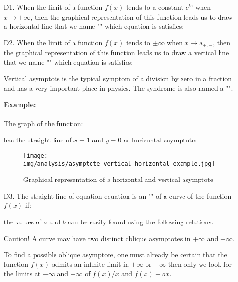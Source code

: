 	\begin{enumerate}
		\item[D1.] When the limit of a function $f(x)$ tends to a constant 
$c^{te}$ when $x \rightarrow \pm \infty$, then the graphical representation of this function leads us to draw a horizontal line that we name "" which equation is satisfies:
		
		
		\item[D2.] When the limit of a function $f(x)$ tends to  
$\pm \infty$ when $x \rightarrow a_{+,-}$, then the graphical representation of this function leads us to draw a vertical line that we name "" which equation is satisfies:
		
		Vertical asymptots is the typical symptom of a division by zero in a fraction and has a very important place in physics. The syndrome is also named a "".
		\begin{tcolorbox}[colframe=black,colback=white,sharp corners]
		\textbf{{\Large {}}Example:}\\\\
		The graph of the function:
		
		 has the straight line of $x=1$ and $y=0$ as horizontal asymptote:
		 \begin{figure}[H]
			\centering
			\texttt{[image: img/analysis/asymptote\_vertical\_horizontal\_example.jpg]}
			\caption{Graphical representation of a  horizontal and vertical asymptote}
		\end{figure}
		\end{tcolorbox}
		
		\item[D3.] The straight line of equation equation is an "" of a curve of the function $f (x)$ if:
		
		the values of $a$ and $b$ can be easily found using the following relations:
		
		\begin{tcolorbox}[title=Remark,colframe=black,arc=10pt]
		Caution! A curve may have two distinct oblique asymptotes in $+\infty$ and $-\infty$.
		\end{tcolorbox}	
		To find a possible oblique asymptote, one must already be certain that the function $f(x)$ admits an infinite limit in $+\infty$ or $-\infty$ then only we look for the limits at $-\infty$ and $+\infty$ of  $f (x) / x$ and $f(x)-ax$.
		

\end{enumerate}

